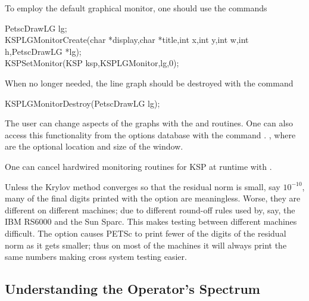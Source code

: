 To employ the default graphical monitor, one should use the 
commands  
\begin{tabbing}
   PetscDrawLG lg;\\
  KSPLGMonitorCreate(char *display,char *title,int x,int y,int w,int h,PetscDrawLG *lg);\\
  KSPSetMonitor(KSP ksp,KSPLGMonitor,lg,0);
\end{tabbing}
When no longer needed, the line graph should be destroyed 
with the command
\begin{tabbing}
  KSPLGMonitorDestroy(PetscDrawLG lg);
\end{tabbing}
The user can change aspects of the graphs with the  and 
 routines.  
One can also access this functionality from the options database 
with the command  \trl{[x,y,w,h]}. , 
where  are the optional location and size of the window.

One can cancel hardwired monitoring routines for KSP at runtime with 
. 

Unless the Krylov method converges so that the residual norm is small,
say $ 10^{-10} $, many of the final digits printed with the 
option are meaningless. Worse, they are different on different 
machines; due to different round-off rules used by, say, the IBM RS6000
and the Sun Sparc. This makes testing between different machines
difficult. The option  
causes PETSc to print fewer of the digits of the residual norm 
as it gets smaller; thus on most of the machines it will always
print the same numbers making cross system testing easier.


\subsection{Understanding the Operator's Spectrum}

